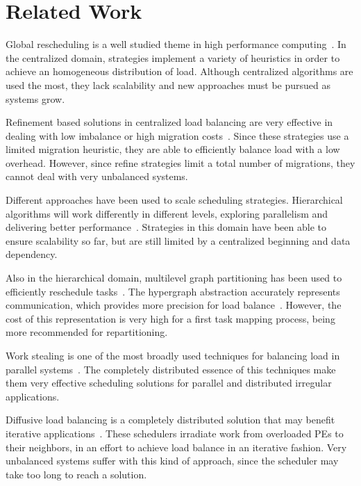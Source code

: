 \section{Related Work} \label{sec:rw}

Global rescheduling is a well studied theme in high performance computing~\cite{Deveci2015,grapevine,nuco,hybrid,ZoltanParHypRepart07,diffus,Zheng2010}. 
In the centralized domain, strategies implement a variety of heuristics in order to achieve an homogeneous distribution of load.
Although centralized algorithms are used the most, they lack scalability and new approaches must be pursued as systems grow.

Refinement based solutions in centralized load balancing are very effective in dealing with low imbalance or high migration costs~\cite{MenonPHD}. 
Since these strategies use a limited migration heuristic, they are able to efficiently balance load with a low overhead.
However, since refine strategies limit a total number of migrations, they cannot deal with very unbalanced systems.

Different approaches have been used to scale scheduling strategies.
Hierarchical algorithms will work differently in different levels, exploring parallelism and delivering better performance~\cite{nuco,hybrid,GengbinThesis}.
Strategies in this domain have been able to ensure scalability so far, but are still limited by a centralized beginning and data dependency.

Also in the hierarchical domain, multilevel graph partitioning has been used to efficiently reschedule tasks~\cite{ZoltanParHypRepart07}.
The hypergraph abstraction accurately represents communication, which provides more precision for load balance~\cite{commaware,Bathele2011graph}.
However, the cost of this representation is very high for a first task mapping process, being more recommended for repartitioning.

Work stealing is one of the most broadly used techniques for balancing load in parallel systems~\cite{DBLP:journals/ijpp/YangH18,Janjic2013}.
The completely distributed essence of this techniques make them very effective scheduling solutions for parallel and distributed irregular applications.

Diffusive load balancing is a completely distributed solution that may benefit iterative applications~\cite{diffus}.
These schedulers irradiate work from overloaded PEs to their neighbors, in an effort to achieve load balance in an iterative fashion.
Very unbalanced systems suffer with this kind of approach, since the scheduler may take too long to reach a solution.

